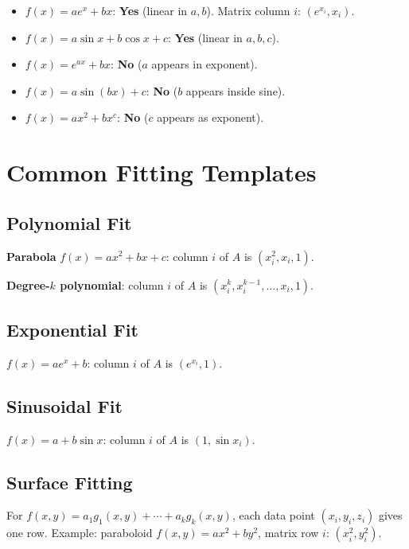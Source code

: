 \begin{example}
\begin{itemize}
  \item $f(x)=ae^x+bx$: \textbf{Yes} (linear in $a,b$). Matrix column $i$: $(e^{x_i},x_i)$.
  \item $f(x)=a\sin x+b\cos x+c$: \textbf{Yes} (linear in $a,b,c$).
  \item $f(x)=e^{ax}+bx$: \textbf{No} ($a$ appears in exponent).
  \item $f(x)=a\sin(bx)+c$: \textbf{No} ($b$ appears inside sine).
  \item $f(x)=ax^2+bx^c$: \textbf{No} ($c$ appears as exponent).
\end{itemize}
\end{example}

\section{Common Fitting Templates}

\subsection*{Polynomial Fit}

\textbf{Parabola} $f(x)=ax^2+bx+c$: column $i$ of $A$ is $(x_i^2,x_i,1)$.

\textbf{Degree-$k$ polynomial}: column $i$ of $A$ is $(x_i^k,x_i^{k-1},\ldots,x_i,1)$.

\subsection*{Exponential Fit}

$f(x)=ae^x+b$: column $i$ of $A$ is $(e^{x_i},1)$.

\subsection*{Sinusoidal Fit}

$f(x)=a+b\sin x$: column $i$ of $A$ is $(1,\sin x_i)$.

\subsection*{Surface Fitting}

For $f(x,y)=a_1g_1(x,y)+\cdots+a_kg_k(x,y)$, each data point $(x_i,y_i,z_i)$ gives one row. Example: paraboloid $f(x,y)=ax^2+by^2$, matrix row $i$: $(x_i^2,y_i^2)$.

